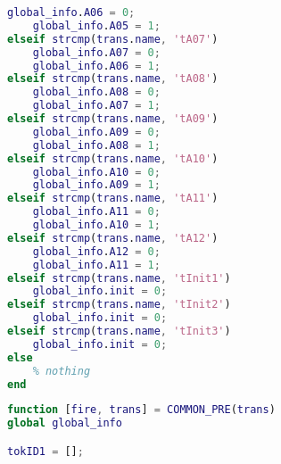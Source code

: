 \begin{lstlisting}[language=MATLAB, caption=COMMON\_POST.m]
    global_info.A06 = 0;
    global_info.A05 = 1;
elseif strcmp(trans.name, 'tA07')
    global_info.A07 = 0;
    global_info.A06 = 1;
elseif strcmp(trans.name, 'tA08')
    global_info.A08 = 0;
    global_info.A07 = 1;
elseif strcmp(trans.name, 'tA09')
    global_info.A09 = 0;
    global_info.A08 = 1;
elseif strcmp(trans.name, 'tA10')
    global_info.A10 = 0;
    global_info.A09 = 1;
elseif strcmp(trans.name, 'tA11')
    global_info.A11 = 0;
    global_info.A10 = 1;
elseif strcmp(trans.name, 'tA12')
    global_info.A12 = 0;
    global_info.A11 = 1;
elseif strcmp(trans.name, 'tInit1')
    global_info.init = 0;
elseif strcmp(trans.name, 'tInit2')
    global_info.init = 0;
elseif strcmp(trans.name, 'tInit3')
    global_info.init = 0;
else
    % nothing
end
\end{lstlisting}


\begin{lstlisting}[language=MATLAB, caption=COMMON\_PRE.m]
% COMMON_PRE.m
function [fire, trans] = COMMON_PRE(trans)
global global_info

tokID1 = [];


\end{lstlisting}

